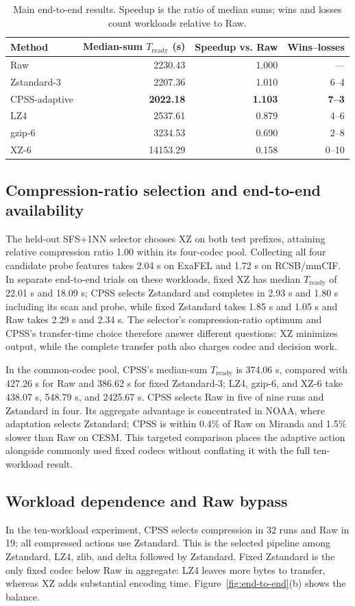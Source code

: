\documentclass[smallabstract,smallcaptions]{dccpaper}
\renewcommand{\SubSection}[1]{\vspace*{-0.125in}\subsection{#1}}
\begin{document}
\begin{table}[t]
\centering
\caption{Main end-to-end results. Speedup is the ratio of median sums; wins and losses count workloads relative to Raw.}
\label{tab:main-results}
\vspace{0.06in}
\small
\begin{tabular}{lrrr}
\toprule
Method & Median-sum $T_{\mathrm{ready}}$ (s) & Speedup vs. Raw & Wins--losses \\
\midrule
Raw & 2230.43 & 1.000 & --- \\
Zstandard-3 & 2207.36 & 1.010 & 6--4 \\
CPSS-adaptive & \textbf{2022.18} & \textbf{1.103} & \textbf{7--3} \\
LZ4 & 2537.61 & 0.879 & 4--6 \\
gzip-6 & 3234.53 & 0.690 & 2--8 \\
XZ-6 & 14153.29 & 0.158 & 0--10 \\
\bottomrule
\end{tabular}
\end{table}

\SubSection{Compression-ratio selection and end-to-end availability}
The held-out SFS+1NN selector chooses XZ on both test prefixes, attaining relative compression ratio 1.00 within its four-codec pool. Collecting all four candidate probe features takes 2.04 s on ExaFEL and 1.72 s on RCSB/mmCIF. In separate end-to-end trials on these workloads, fixed XZ has median $T_{\mathrm{ready}}$ of 22.01 s and 18.09 s; CPSS selects Zstandard and completes in 2.93 s and 1.80 s including its scan and probe, while fixed Zstandard takes 1.85 s and 1.05 s and Raw takes 2.29 s and 2.34 s. The selector's compression-ratio optimum and CPSS's transfer-time choice therefore answer different questions: XZ minimizes output, while the complete transfer path also charges codec and decision work.

In the common-codec pool, CPSS's median-sum $T_{\mathrm{ready}}$ is 374.06 s, compared with 427.26 s for Raw and 386.62 s for fixed Zstandard-3; LZ4, gzip-6, and XZ-6 take 438.07 s, 548.79 s, and 2425.67 s. CPSS selects Raw in five of nine runs and Zstandard in four. Its aggregate advantage is concentrated in NOAA, where adaptation selects Zstandard; CPSS is within 0.4\% of Raw on Miranda and 1.5\% slower than Raw on CESM. This targeted comparison places the adaptive action alongside commonly used fixed codecs without conflating it with the full ten-workload result.

\SubSection{Workload dependence and Raw bypass}
In the ten-workload experiment, CPSS selects compression in 32 runs and Raw in 19; all compressed actions use Zstandard. This is the selected pipeline among Zstandard, LZ4, zlib, and delta followed by Zstandard. Fixed Zstandard is the only fixed codec below Raw in aggregate: LZ4 leaves more bytes to transfer, whereas XZ adds substantial encoding time. Figure~\ref{fig:end-to-end}(b) shows the balance.
\end{document}
